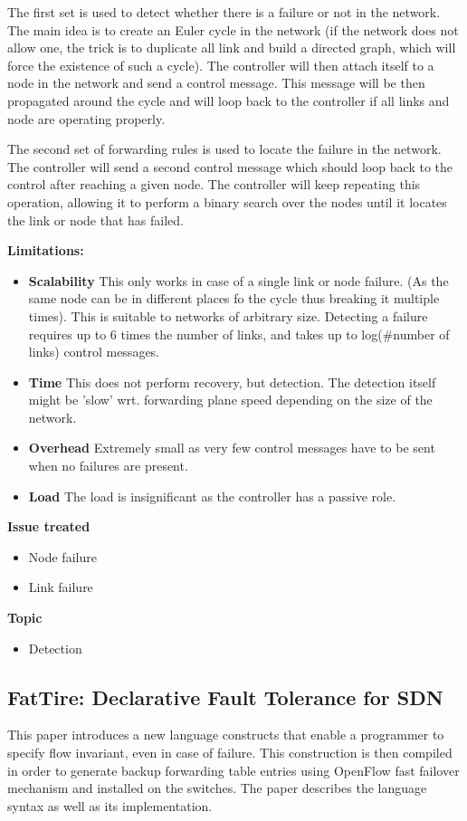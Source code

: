 \documentclass[compsoc]{IEEEtran}
\begin{document}
The first set is used to detect whether there is a failure or not in the network.
The main idea is to create an Euler cycle in the network (if the network does not allow one, the trick is to duplicate all link and build a directed graph, which will force the existence of such a cycle). The controller will then attach itself to a node in the network and send a control message. This message will be then propagated around the cycle and will loop back to the controller if all links and node are operating properly.

The second set of forwarding rules is used to locate the failure in the network. The controller will send a second control message which should loop back to the control after reaching a given node. The controller will keep repeating this operation, allowing it to perform a binary search over the nodes until it locates the link or node that has failed.

\textbf{Limitations:}
\begin{itemize}
	\item \textbf{Scalability} This only works in case of a single link or node failure. (As the same node can be in different places fo the cycle thus breaking it multiple times). This is suitable to networks of arbitrary size. Detecting a failure requires up to 6 times the number of links, and takes up to log(\#number of links) control messages.
	\item \textbf{Time} This does not perform recovery, but detection. The detection itself might be 'slow' wrt. forwarding plane speed depending on the size of the network.
	\item \textbf{Overhead} Extremely small as very few control messages have to be sent when no failures are present.
	\item \textbf{Load} The load is insignificant as the controller has a passive role.
\end{itemize}

\textbf{Issue treated}
\begin{itemize}
	\item Node failure
	\item Link failure
\end{itemize}

\textbf{Topic}
\begin{itemize}
	\item Detection
\end{itemize}

\subsection{FatTire: Declarative Fault Tolerance for SDN \cite{Reitblatt:2013:FDF:2491185.2491187}}
This paper introduces a new language constructs that enable a programmer to specify flow invariant, even in case of failure. This construction is then compiled in order to generate backup forwarding table entries using OpenFlow fast failover mechanism and installed on the switches.
The paper describes the language syntax as well as its implementation.
\end{document}
